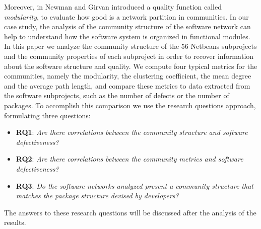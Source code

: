 Moreover, in \cite{NG:2004} Newman and Girvan introduced a quality function called \textit{modularity}, 
to evaluate how good is a network partition in communities. 
In our case study, the analysis of the community structure of the software 
network can help to understand how the software system is organized 
in functional modules. 
\\
In this paper we analyze the community structure 
of the 56 Netbeans subprojects and the community 
properties of each subproject in order to recover information about 
the software structure and quality. We compute four  
typical metrics for the communities, namely the modularity, 
the clustering coefficient, the mean degree and the average path length, 
and compare these metrics to data extracted from the 
software subprojects, such as the number of defects or the 
number of packages. 
To accomplish this comparison we use the research questions approach, 
formulating three questions: 
\begin{itemize}

\item \textbf{RQ1}: \textit{Are there correlations between the 
community structure and software defectiveness?} 

\item  \textbf{RQ2}: \textit{Are there correlations between the community 
metrics and software defectiveness?}

\item  \textbf{RQ3}: \textit{Do the software networks analyzed present a community structure that matches the package
structure devised by developers? 
}
\end{itemize}
The answers to these research questions will be discussed after the analysis 
of the results. 


